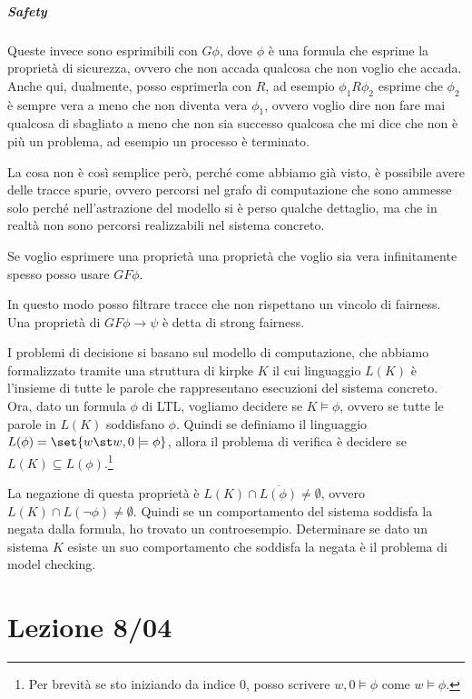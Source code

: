 \paragraph{Safety}
Queste invece sono esprimibili con \(G\phi\), dove \(\phi\) è una formula che esprime la proprietà di sicurezza, ovvero che non accada qualcosa che non voglio che accada. Anche qui, dualmente, posso esprimerla con \(R\), ad esempio \(\phi_1 R \phi_2\) esprime che \(\phi_2\) è sempre vera a meno che non diventa vera \(\phi_1\), ovvero voglio dire non fare mai qualcosa di sbagliato a meno che non sia successo qualcosa che mi dice che non è più un problema, ad esempio un processo è terminato.

La cosa non è così semplice però, perché come abbiamo già visto, è possibile avere delle tracce spurie, ovvero percorsi nel grafo di computazione che sono ammesse solo perché nell'astrazione del modello si è perso qualche dettaglio, ma che in realtà non sono percorsi realizzabili nel sistema concreto.

Se voglio esprimere una proprietà una proprietà che voglio sia vera infinitamente spesso posso usare \(G F \phi\).

In questo modo posso filtrare tracce che non rispettano un vincolo di fairness. Una proprietà di \(G F \phi \to \psi\) è detta di strong fairness.

I problemi di decisione si basano sul modello di computazione, che abbiamo formalizzato tramite una struttura di kirpke \(K\) il cui linguaggio \(L(K)\) è l'insieme di tutte le parole che rappresentano esecuzioni del sistema concreto. Ora, dato un formula \(\phi\) di LTL\@, vogliamo decidere se \(K \models \phi\), ovvero se tutte le parole in \(L(K)\) soddisfano \(\phi\). Quindi se definiamo il linguaggio \(L(\phi) = \set{w \st w,0 \models \phi}\), allora il problema di verifica è decidere se \(L(K) \subseteq L(\phi)\).\footnote{Per brevità se sto iniziando da indice \(0\), posso scrivere \(w,0\models \phi\) come \(w\models \phi\).}

La negazione di questa proprietà è \(L(K) \cap \overline{L(\phi)} \neq \emptyset\), ovvero \(L(K) \cap L(\neg \phi) \neq \emptyset\). Quindi se un comportamento del sistema soddisfa la negata dalla formula, ho trovato un controesempio. Determinare se dato un sistema \(K\) esiste un suo comportamento che soddisfa la negata è il problema di model checking.

\chapter{Lezione 8/04}


